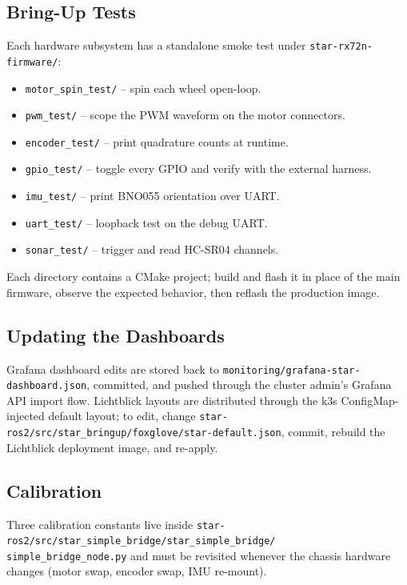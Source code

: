 \documentclass[11pt,letterpaper]{article}
\begin{document}
\subsection{Bring-Up Tests}
Each hardware subsystem has a standalone smoke test under
\texttt{star-rx72n-firmware/}:
\begin{itemize}[leftmargin=1.4em,itemsep=2pt]
\item \texttt{motor\_spin\_test/} -- spin each wheel open-loop.
\item \texttt{pwm\_test/} -- scope the PWM waveform on the motor
      connectors.
\item \texttt{encoder\_test/} -- print quadrature counts at runtime.
\item \texttt{gpio\_test/} -- toggle every GPIO and verify with the
      external harness.
\item \texttt{imu\_test/} -- print BNO055 orientation over UART.
\item \texttt{uart\_test/} -- loopback test on the debug UART.
\item \texttt{sonar\_test/} -- trigger and read HC-SR04 channels.
\end{itemize}
Each directory contains a CMake project; build and flash it in place
of the main firmware, observe the expected behavior, then reflash the
production image.

\subsection{Updating the Dashboards}
Grafana dashboard edits are stored back to
\texttt{monitoring/grafana-star-dashboard.json}, committed, and
pushed through the cluster admin's Grafana API import flow. Lichtblick
layouts are distributed through the k3s ConfigMap-injected default
layout; to edit, change
\texttt{star-ros2/src/star\_bringup/foxglove/star-default.json},
commit, rebuild the Lichtblick deployment image, and re-apply.

\subsection{Calibration}
Three calibration constants live inside
\texttt{star-ros2/src/star\_simple\_bridge/star\_simple\_bridge/}\\
\texttt{simple\_bridge\_node.py} and must be revisited whenever the
chassis hardware changes (motor swap, encoder swap, IMU re-mount).
\end{document}
